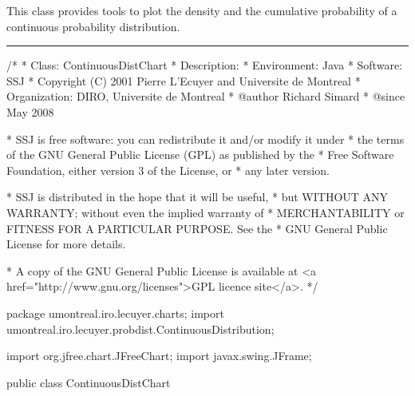 
This class provides tools to plot the density and the cumulative probability
 of a continuous probability distribution.


\bigskip\hrule
\begin{code}
\begin{hide}
/*
 * Class:        ContinuousDistChart
 * Description:  
 * Environment:  Java
 * Software:     SSJ 
 * Copyright (C) 2001  Pierre L'Ecuyer and Universite de Montreal
 * Organization: DIRO, Universite de Montreal
 * @author       Richard Simard
 * @since        May 2008

 * SSJ is free software: you can redistribute it and/or modify it under
 * the terms of the GNU General Public License (GPL) as published by the
 * Free Software Foundation, either version 3 of the License, or
 * any later version.

 * SSJ is distributed in the hope that it will be useful,
 * but WITHOUT ANY WARRANTY; without even the implied warranty of
 * MERCHANTABILITY or FITNESS FOR A PARTICULAR PURPOSE.  See the
 * GNU General Public License for more details.

 * A copy of the GNU General Public License is available at
   <a href="http://www.gnu.org/licenses">GPL licence site</a>.
 */
\end{hide}
package umontreal.iro.lecuyer.charts;
   import umontreal.iro.lecuyer.probdist.ContinuousDistribution;\begin{hide}

import org.jfree.chart.JFreeChart;
import javax.swing.JFrame;
\end{hide}


public class ContinuousDistChart \begin{hide} {
   protected ContinuousDistribution dist;
   protected double a,b;
   protected int m;
   protected XYLineChart cdfChart;
   protected XYLineChart densityChart;

   private void init() {
      double[][] cdf = new double[2][m+1];
      double[][] density = new double[2][m+1];
      double h = (b - a) / m;
      double x;
      int coex = 0;

      try {
         for (int i = 0; i <= m; i++) {
            x = a + i*h;
            cdf[0][i] = x;
            cdf[1][i] = dist.cdf (x);
         }
         cdfChart = new XYLineChart("cdf: " + dist.toString(), "", "", cdf);
      } catch (UnsupportedOperationException e) {
         coex++;
         System.err.println (e);
//         e.printStackTrace();
      }

      try {
         for (int i = 0; i <= m; i++) {
            x = a + i*h;
            density[0][i] = x;
            density[1][i] = dist.density (x);
         }
         densityChart = new XYLineChart("density: " + dist.toString(),
                                        "", "", density);
      } catch (UnsupportedOperationException e) {
         System.err.println (e);
         if (coex == 1)
            throw e;
      }
      cdfChart.setprobFlag (true);
      densityChart.setprobFlag (true);
   }
\end{hide}\end{code}

